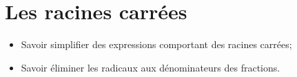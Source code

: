 \chapter{Les racines carrées }\label{ChLesRacinesCarrees}

\begin{acquis}
\begin{itemize}
\item Savoir simplifier des expressions comportant des racines carrées;
\item Savoir éliminer les radicaux aux dénominateurs des fractions.
\end{itemize}
\end{acquis}


\exercicesbase
\begin{colonne*exercice}

\end{colonne*exercice}




\connaissances




\pagebreak



